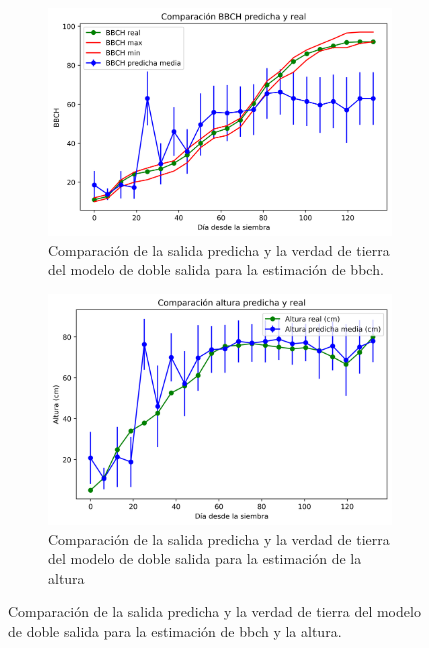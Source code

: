 \begin{figure}[H]
\centering
\begin{subfigure}{\textwidth}
  \centering
  \includegraphics[width=0.95\linewidth]{archivos/tfg/Pixel/BBCHH_COMPARACION_BIEN_BBCH}
  \caption{Comparación de la salida predicha y la verdad de tierra del modelo de doble salida para la estimación de \gls{bbch}. \label{fig:p_sub_c1}}
\end{subfigure}

\begin{subfigure}{\textwidth}
  \centering
  \includegraphics[width=0.95\linewidth]{archivos/tfg/Pixel/BBCHH_COMPARACION_BIEN_H}
  \caption{Comparación de la salida predicha y la verdad de tierra del modelo de doble salida para la estimación de la altura\label{fig:p_sub_c2}}
\end{subfigure}

\caption{Comparación de la salida predicha y la verdad de tierra del modelo de doble salida para la estimación de \gls{bbch} y la altura. \label{fig:p_comp_bh}}
\end{figure}

